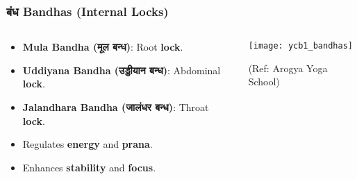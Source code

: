 \begin{frame}[fragile]\frametitle{बंध  Bandhas (Internal Locks)}


\begin{columns}
    \begin{column}[T]{0.5\linewidth}
      \begin{itemize}
        \item \textbf{Mula Bandha (मूल बन्ध)}: Root \textbf{lock}.
        \item \textbf{Uddiyana Bandha (उड्डीयान बन्ध)}: Abdominal \textbf{lock}.
        \item \textbf{Jalandhara Bandha (जालंधर बन्ध)}: Throat \textbf{lock}.
        \item Regulates \textbf{energy} and \textbf{prana}.
        \item Enhances \textbf{stability} and \textbf{focus}.
      \end{itemize}
    \end{column}
    \begin{column}[T]{0.5\linewidth}
        \begin{center}
        \texttt{[image: ycb1\_bandhas]}
				
		{\tiny (Ref: Arogya Yoga School)}	 
        \end{center}	
    \end{column}
\end{columns}
\end{frame}


